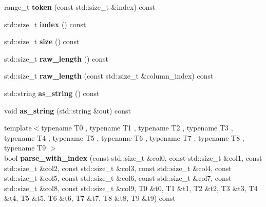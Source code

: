\begin{DoxyCompactItemize}
\item 
\hypertarget{classstrtk_1_1token__grid_1_1row__type_a599f1961841bd4d0cb494ef10a81b5fa}{range\-\_\-t {\bfseries token} (const std\-::size\-\_\-t \&index) const }\label{classstrtk_1_1token__grid_1_1row__type_a599f1961841bd4d0cb494ef10a81b5fa}

\item 
\hypertarget{classstrtk_1_1token__grid_1_1row__type_a8b67bc1789b49cd27d018c43f70afcc8}{std\-::size\-\_\-t {\bfseries index} () const }\label{classstrtk_1_1token__grid_1_1row__type_a8b67bc1789b49cd27d018c43f70afcc8}

\item 
\hypertarget{classstrtk_1_1token__grid_1_1row__type_ab4dc016699cd2f77ec0e453e106eaf49}{std\-::size\-\_\-t {\bfseries size} () const }\label{classstrtk_1_1token__grid_1_1row__type_ab4dc016699cd2f77ec0e453e106eaf49}

\item 
\hypertarget{classstrtk_1_1token__grid_1_1row__type_afc06c4d4163128352c4ac8b0d293b002}{std\-::size\-\_\-t {\bfseries raw\-\_\-length} () const }\label{classstrtk_1_1token__grid_1_1row__type_afc06c4d4163128352c4ac8b0d293b002}

\item 
\hypertarget{classstrtk_1_1token__grid_1_1row__type_a68aadd95c3a77fa93c8edbfdaa07f364}{std\-::size\-\_\-t {\bfseries raw\-\_\-length} (const std\-::size\-\_\-t \&column\-\_\-index) const }\label{classstrtk_1_1token__grid_1_1row__type_a68aadd95c3a77fa93c8edbfdaa07f364}

\item 
\hypertarget{classstrtk_1_1token__grid_1_1row__type_aa370a115f8b964d43d666808ed99f9f8}{std\-::string {\bfseries as\-\_\-string} () const }\label{classstrtk_1_1token__grid_1_1row__type_aa370a115f8b964d43d666808ed99f9f8}

\item 
\hypertarget{classstrtk_1_1token__grid_1_1row__type_a8b949555004ed6ff7e09ee25ce90c43a}{void {\bfseries as\-\_\-string} (std\-::string \&out) const }\label{classstrtk_1_1token__grid_1_1row__type_a8b949555004ed6ff7e09ee25ce90c43a}

\item 
\hypertarget{classstrtk_1_1token__grid_1_1row__type_a8836f04ba541110aaf90b40f4e42f2df}{{\footnotesize template$<$typename T0 , typename T1 , typename T2 , typename T3 , typename T4 , typename T5 , typename T6 , typename T7 , typename T8 , typename T9 $>$ }\\bool {\bfseries parse\-\_\-with\-\_\-index} (const std\-::size\-\_\-t \&col0, const std\-::size\-\_\-t \&col1, const std\-::size\-\_\-t \&col2, const std\-::size\-\_\-t \&col3, const std\-::size\-\_\-t \&col4, const std\-::size\-\_\-t \&col5, const std\-::size\-\_\-t \&col6, const std\-::size\-\_\-t \&col7, const std\-::size\-\_\-t \&col8, const std\-::size\-\_\-t \&col9, T0 \&t0, T1 \&t1, T2 \&t2, T3 \&t3, T4 \&t4, T5 \&t5, T6 \&t6, T7 \&t7, T8 \&t8, T9 \&t9) const }\label{classstrtk_1_1token__grid_1_1row__type_a8836f04ba541110aaf90b40f4e42f2df}


\end{DoxyCompactItemize}
